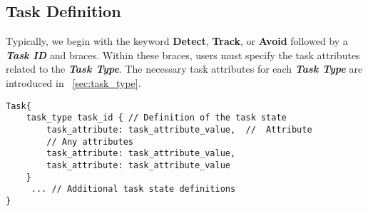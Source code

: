 \subsection{Task Definition}
Typically, we begin with the keyword \textbf{Detect}, \textbf{Track}, or \textbf{Avoid} followed by a \textit{\textbf{Task ID}} and braces. Within these braces, users must specify the task attributes related to the \textit{\textbf{Task Type}}. The necessary task attributes for each \textbf{\textit{Task Type}} are introduced in ~\ref{sec:task_type}.

\begin{lstlisting}[style=customgo]
Task{
    task_type task_id { // Definition of the task state
        task_attribute: task_attribute_value,  //  Attribute
        // Any attributes
        task_attribute: task_attribute_value,  
        task_attribute: task_attribute_value 
    }
     ... // Additional task state definitions
}
\end{lstlisting}


